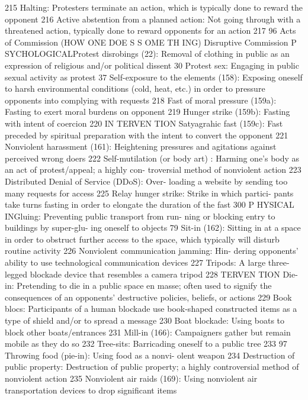 \documentclass[twoside,a4paper,12pt,fleqn,openany]{extbook}
\begin{document}
 215
Halting: Protesters terminate an action, which
is typically done to reward the opponent 216
Active abstention from a planned action:
Not going through with a threatened action,
typically done to reward opponents for an
action
 217
96
Acts of Commission
(HOW ONE DOE S S OME TH ING)
Disruptive Commission
P SYCHOLOGICALProtest disrobings (22): Removal of clothing
in public as an expression of religious and/or
political dissent
 30
Protest sex: Engaging in public sexual activity
as protest
 37
Self-exposure to the elements (158): Exposing
oneself to harsh environmental conditions
(cold, heat, etc.) in order to pressure opponents
into complying with requests
 218
Fast of moral pressure (159a): Fasting to exert
moral burdens on opponent
 219
Hunger strike (159b): Fasting with intent of
coercion
 220
IN TERVEN TION
Satyagrahic fast (159c): Fast preceded by
spiritual preparation with the intent to convert
the opponent
 221
Nonviolent harassment (161): Heightening
pressures and agitations against perceived
wrong doers
 222
Self-mutilation (or body art) : Harming one’s
body as an act of protest/appeal; a highly con-
troversial method of nonviolent action
 223
Distributed Denial of Service (DDoS): Over-
loading a website by sending too many requests
for access
 225
Relay hunger strike: Strike in which partici-
pants take turns fasting in order to elongate
the duration of the fast
 300
P HYSICAL INGluing: Preventing public transport from run-
ning or blocking entry to buildings by super-glu-
ing oneself to objects
 79
Sit-in (162): Sitting in at a space in order to
obstruct further access to the space, which
typically will disturb routine activity
 226
Nonviolent communication jamming: Hin-
dering opponents’ ability to use technological
communication devices
 227
Tripods: A large three-legged blockade device
that resembles a camera tripod
 228
TERVEN TION
Die-in: Pretending to die in a public space en
masse; often used to signify the consequences
of an opponents’ destructive policies, beliefs,
or actions
 229
Book blocs: Participants of a human blockade
use book-shaped constructed items as a type
of shield and/or to spread a message
 230
Boat blockade: Using boats to block other
boats/entrances
 231
Mill-in (166): Campaigners gather but remain
mobile as they do so
 232
Tree-sits: Barricading oneself to a public
tree
 233
97
Throwing food (pie-in): Using food as a nonvi-
olent weapon
 234
Destruction of public property: Destruction of
public property; a highly controversial method
of nonviolent action
 235
Nonviolent air raids (169): Using nonviolent air
transportation devices to drop significant items
\end{document}
